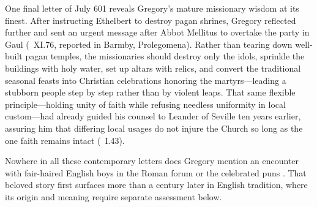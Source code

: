 One final letter of July 601 reveals Gregory's mature missionary wisdom at its
finest. After instructing Ethelbert to destroy pagan shrines, Gregory reflected
further and sent an urgent message after Abbot Mellitus to overtake the party
in Gaul (\ XI.76, reported in Barmby, Prolegomena). Rather than
tearing down well-built pagan temples, the missionaries should destroy only the
idols, sprinkle the buildings with holy water, set up altars with relics, and
convert the traditional seasonal feasts into Christian celebrations honoring
the martyrs---leading a stubborn people step by step rather than by violent
leaps. That same flexible principle---holding unity of faith while refusing
needless uniformity in local custom---had already guided his counsel to Leander
of Seville ten years earlier, assuring him that differing local usages do not
injure the Church so long as the one faith remains intact (\ I.43).

Nowhere in all these contemporary letters does Gregory mention an encounter
with fair-haired English boys in the Roman forum or the celebrated puns
. That beloved story first surfaces more than a
century later in English tradition, where its origin and meaning require
separate assessment below.
